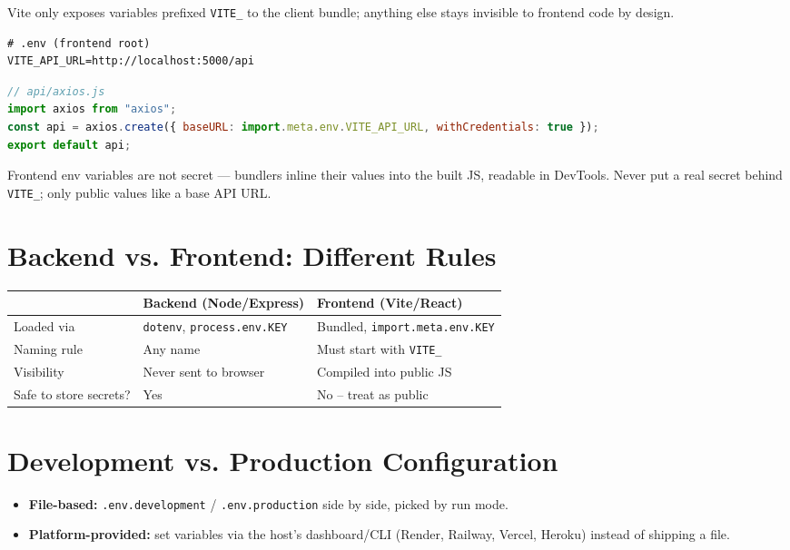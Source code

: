 Vite only exposes variables prefixed \texttt{VITE\_} to the client bundle;
anything else stays invisible to frontend code by design.

\begin{lstlisting}
# .env (frontend root)
VITE_API_URL=http://localhost:5000/api
\end{lstlisting}

\begin{lstlisting}[language=JavaScript]
// api/axios.js
import axios from "axios";
const api = axios.create({ baseURL: import.meta.env.VITE_API_URL, withCredentials: true });
export default api;
\end{lstlisting}

\begin{warnbox}[WARNING]
Frontend env variables are not secret --- bundlers inline their values into
the built JS, readable in DevTools. Never put a real secret behind
\texttt{VITE\_}; only public values like a base API URL.
\end{warnbox}

\section{Backend vs. Frontend: Different Rules}

\begin{center}
\begin{tabularx}{\textwidth}{lXX}
\toprule
\textbf{} & \textbf{Backend (Node/Express)} & \textbf{Frontend (Vite/React)} \\
\midrule
Loaded via & \texttt{dotenv}, \texttt{process.env.KEY} & Bundled, \texttt{import.meta.env.KEY} \\
Naming rule & Any name & Must start with \texttt{VITE\_} \\
Visibility & Never sent to browser & Compiled into public JS \\
Safe to store secrets? & Yes & No -- treat as public \\
\bottomrule
\end{tabularx}
\end{center}

\section{Development vs. Production Configuration}

\begin{itemize}
\item \textbf{File-based:} \texttt{.env.development} / \texttt{.env.production} side by side, picked by run mode.
\item \textbf{Platform-provided:} set variables via the host's dashboard/CLI (Render, Railway, Vercel, Heroku) instead of shipping a file.
\end{itemize}

